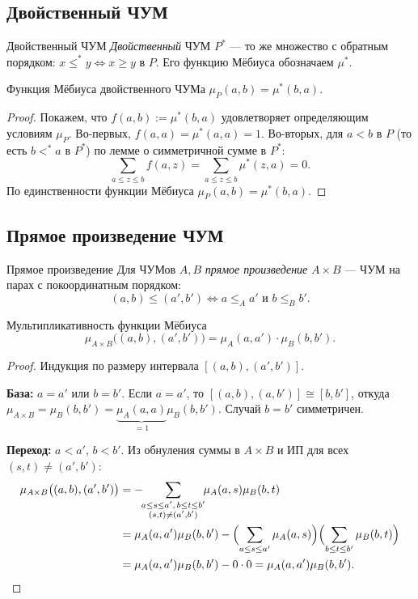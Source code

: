 \subsection{Двойственный ЧУМ}

\begin{Definition}{Двойственный ЧУМ}{}
	\emph{Двойственный} ЧУМ $P^*$ — то же множество с обратным порядком: $x\le^* y\Leftrightarrow x\ge y$ в $P$. Его функцию Мёбиуса обозначаем $\mu^*$.
\end{Definition}

\begin{Theorem}{Функция Мёбиуса двойственного ЧУМа}{}
	$\mu_P(a,b)=\mu^*(b,a)$.
\end{Theorem}

\begin{proof}
	Покажем, что $f(a,b):=\mu^*(b,a)$ удовлетворяет определяющим условиям $\mu_P$. Во-первых, $f(a,a)=\mu^*(a,a)=1$. Во-вторых, для $a<b$ в $P$ (то есть $b<^*a$ в $P^*$) по лемме о симметричной сумме в $P^*$:
	\[
	\sum_{a\le z\le b}f(a,z)=\sum_{a\le z\le b}\mu^*(z,a)=0.
	\]
	По единственности функции Мёбиуса $\mu_P(a,b)=\mu^*(b,a)$.
\end{proof}

\subsection{Прямое произведение ЧУМ}

\begin{Definition}{Прямое произведение}{}
	Для ЧУМов $A,B$ \emph{прямое произведение} $A\times B$ — ЧУМ на парах с покоординатным порядком:
	\[
	(a,b)\le(a',b')\Leftrightarrow a\le_A a'\text{ и }b\le_B b'.
	\]
\end{Definition}

\begin{Theorem}{Мультипликативность функции Мёбиуса}{}
	\[
	\mu_{A\times B}\bigl((a,b),(a',b')\bigr)=\mu_A(a,a')\cdot\mu_B(b,b').
	\]
\end{Theorem}

\begin{proof}
	Индукция по размеру интервала $[(a,b),(a',b')]$.

	\textbf{База:} $a=a'$ или $b=b'$. Если $a=a'$, то $[(a,b),(a,b')]\cong[b,b']$, откуда $\mu_{A\times B}=\mu_B(b,b')=\underbrace{\mu_A(a,a)}_{=1}\mu_B(b,b')$. Случай $b=b'$ симметричен.

	\textbf{Переход:} $a<a'$, $b<b'$. Из обнуления суммы в $A\times B$ и ИП для всех $(s,t)\neq(a',b')$:
	\begin{align*}
		\mu_{A\times B}\bigl((a,b),(a',b')\bigr)
		&=-\!\!\sum_{\substack{a\le s\le a',\,b\le t\le b'\\(s,t)\neq(a',b')}}\!\!\mu_A(a,s)\mu_B(b,t)\\
		&=\mu_A(a,a')\mu_B(b,b')-\Bigl(\sum_{a\le s\le a'}\mu_A(a,s)\Bigr)\Bigl(\sum_{b\le t\le b'}\mu_B(b,t)\Bigr)\\
		&=\mu_A(a,a')\mu_B(b,b')-0\cdot 0=\mu_A(a,a')\mu_B(b,b').
	\end{align*}
\end{proof}

